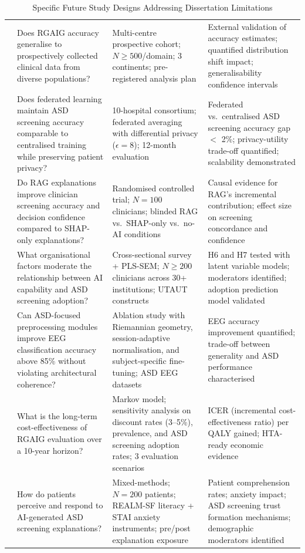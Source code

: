 {\tablestripes\tablefontsize
\begin{xltabular}{\textwidth}{@{} p{1.0cm} p{4.4cm} p{4.3cm} p{4.4cm} @{}}
\caption[Specific Future Study Designs Addressing Dissertation]{Specific Future Study Designs Addressing Dissertation Limitations}\label{tab:future_studies} \\
\toprule
\thead{\#} &  &  &  \\
\midrule
\endfirsthead
\endhead
\bottomrule
{} & Does RGAIG accuracy generalise to prospectively collected clinical data from diverse populations? & Multi-centre prospective cohort; $N \geq 500$/domain; 3 continents; pre-registered analysis plan & External validation of accuracy estimates; quantified distribution shift impact; generalisability confidence intervals \\
 & Does federated learning maintain ASD screening accuracy comparable to centralised training while preserving patient privacy? & 10-hospital consortium; federated averaging with differential privacy ($\epsilon = 8$); 12-month evaluation & Federated vs.\ centralised ASD screening accuracy gap $<$ 2\%; privacy-utility trade-off quantified; scalability demonstrated \\
 & Do RAG explanations improve clinician screening accuracy and decision confidence compared to SHAP-only explanations? & Randomised controlled trial; $N = 100$ clinicians; blinded RAG vs.\ SHAP-only vs.\ no-AI conditions & Causal evidence for RAG's incremental contribution; effect size on screening concordance and confidence \\
 & What organisational factors moderate the relationship between AI capability and ASD screening adoption? & Cross-sectional survey + PLS-SEM; $N \geq 200$ clinicians across 30+ institutions; UTAUT constructs & H6 and H7 tested with latent variable models; moderators identified; adoption prediction model validated \\
 & Can ASD-focused preprocessing modules improve EEG classification accuracy above 85\% without violating architectural coherence? & Ablation study with Riemannian geometry, session-adaptive normalisation, and subject-specific fine-tuning; ASD EEG datasets & EEG accuracy improvement quantified; trade-off between generality and ASD performance characterised \\
 & What is the long-term cost-effectiveness of RGAIG evaluation over a 10-year horizon? & Markov model; sensitivity analysis on discount rates (3--5\%), prevalence, and ASD screening adoption rates; 3 evaluation scenarios & ICER (incremental cost-effectiveness ratio) per QALY gained; HTA-ready economic evidence \\
 & How do patients perceive and respond to AI-generated ASD screening explanations? & Mixed-methods; $N = 200$ patients; REALM-SF literacy + STAI anxiety instruments; pre/post explanation exposure & Patient comprehension rates; anxiety impact; ASD screening trust formation mechanisms; demographic moderators identified \\
\end{xltabular}}
